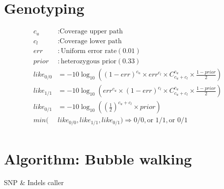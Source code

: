 \documentclass{bmcart}
\begin{document}
\section{Genotyping} %
\begin{align*}
       c_u &: \text{Coverage upper path} \\
       c_l &: \text{Coverage lower path}\\
       err &: \text{Uniform error rate} (0.01) \\
       prior &: \text{heterozygous prior} (0.33)\\
       like_{0/0}&=-10\log_{10}\left((1-err)^{c_u}\times err^{c_l}\times C_{c_u+c_l}^{c_u} \times \frac{1-prior}{2}\right)\\
       like_{1/1}&=-10\log_{10}\left(err^{c_u}\times (1-err)^{c_l}\times C_{c_u+c_l}^{c_u} \times \frac{1-prior}{2}\right)\\
       like_{0/1}&=-10\log_{10}\left(\left(\frac{1}{2}\right)^{c_u+c_l}\times prior\right)\\
       min(&like_{0/0},like_{1/1},like_{0/1}) \Rightarrow 0/0, \text{or } 1/1, \text{or } 0/1\\
\end{align*}

\section{Algorithm: Bubble walking}

\begin{algorithm}
 \begin{algorithmic}[1]
 \EndFor
{}
\EndIf
\EndFor
 \end{algorithmic}
 \caption{SNP \& Indels caller}
\end{algorithm}
\end{document}
